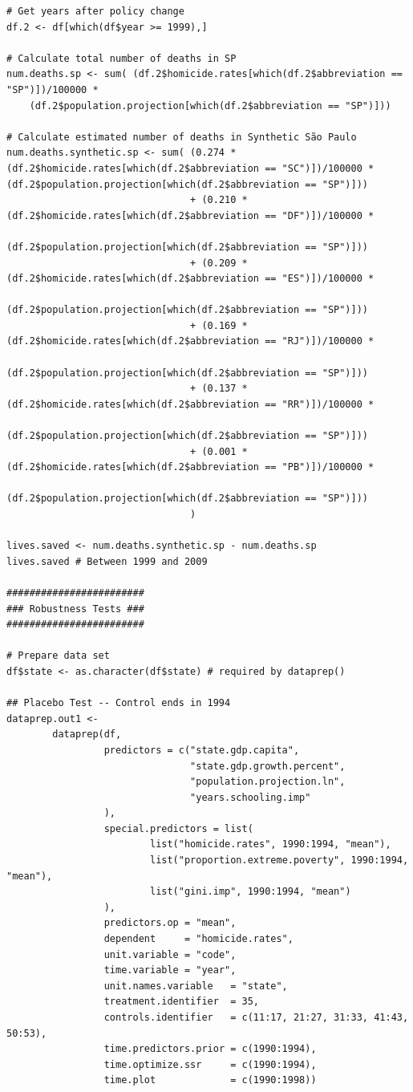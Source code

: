 \begin{verbatim}
# Get years after policy change
df.2 <- df[which(df$year >= 1999),]

# Calculate total number of deaths in SP
num.deaths.sp <- sum( (df.2$homicide.rates[which(df.2$abbreviation == "SP")])/100000 *
    (df.2$population.projection[which(df.2$abbreviation == "SP")]))

# Calculate estimated number of deaths in Synthetic São Paulo
num.deaths.synthetic.sp <- sum( (0.274 * (df.2$homicide.rates[which(df.2$abbreviation == "SC")])/100000 *
(df.2$population.projection[which(df.2$abbreviation == "SP")]))
                                + (0.210 * (df.2$homicide.rates[which(df.2$abbreviation == "DF")])/100000 *
                                (df.2$population.projection[which(df.2$abbreviation == "SP")]))
                                + (0.209 * (df.2$homicide.rates[which(df.2$abbreviation == "ES")])/100000 *
                                (df.2$population.projection[which(df.2$abbreviation == "SP")]))
                                + (0.169 * (df.2$homicide.rates[which(df.2$abbreviation == "RJ")])/100000 *
                                (df.2$population.projection[which(df.2$abbreviation == "SP")]))
                                + (0.137 * (df.2$homicide.rates[which(df.2$abbreviation == "RR")])/100000 *
                                (df.2$population.projection[which(df.2$abbreviation == "SP")]))
                                + (0.001 * (df.2$homicide.rates[which(df.2$abbreviation == "PB")])/100000 *
                                (df.2$population.projection[which(df.2$abbreviation == "SP")]))
                                )

lives.saved <- num.deaths.synthetic.sp - num.deaths.sp
lives.saved # Between 1999 and 2009

########################
### Robustness Tests ###
########################

# Prepare data set
df$state <- as.character(df$state) # required by dataprep()

## Placebo Test -- Control ends in 1994
dataprep.out1 <-
        dataprep(df,
                 predictors = c("state.gdp.capita",
                                "state.gdp.growth.percent",
                                "population.projection.ln",
                                "years.schooling.imp"
                 ),
                 special.predictors = list(
                         list("homicide.rates", 1990:1994, "mean"),
                         list("proportion.extreme.poverty", 1990:1994, "mean"),
                         list("gini.imp", 1990:1994, "mean")
                 ),
                 predictors.op = "mean",
                 dependent     = "homicide.rates",
                 unit.variable = "code",
                 time.variable = "year",
                 unit.names.variable   = "state",
                 treatment.identifier  = 35,
                 controls.identifier   = c(11:17, 21:27, 31:33, 41:43, 50:53),
                 time.predictors.prior = c(1990:1994),
                 time.optimize.ssr     = c(1990:1994),
                 time.plot             = c(1990:1998))


\end{verbatim}
